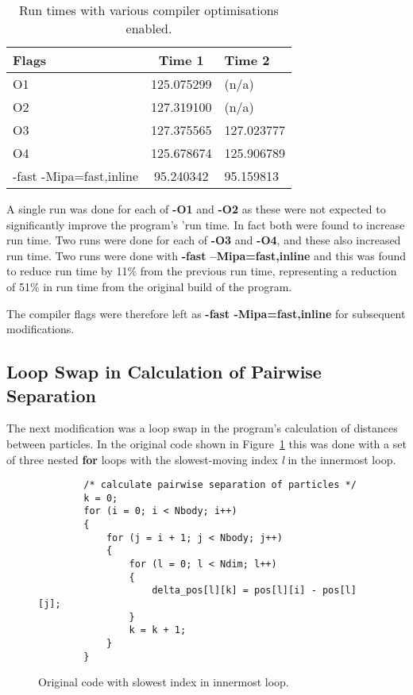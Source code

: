 \documentclass[11pt, oneside]{article}   %
\begin{document}
\begin{table}[h]
	\begin{center}
		\begin{tabular}{||l|c|l||}
			\hline
			{\bf Flags} & {\bf Time 1} & {\bf Time 2}\\
			\hline
				O1  &  125.075299  &  (n/a)\\
				O2  &  127.319100  &  (n/a)\\ 
				O3  &  127.375565  &  127.023777\\
				O4  &  125.678674  &  125.906789\\
				-fast -Mipa=fast,inline  &  95.240342  &  95.159813\\
			\hline
		\end{tabular}
	\end{center}
	\caption{Run times with various compiler optimisations enabled.}
	\label{table:OptFlags}
\end{table}

A single run was done for each of \textbf{-O1} and \textbf{-O2} as these were not expected to significantly improve the program's 'run time.  
In fact both were found to increase run time.
Two runs were done for each of \textbf{-O3} and \textbf{-O4}, and these also increased run time.
Two runs were done with \textbf{-fast –Mipa=fast,inline} and this was found to reduce run time by 11\% from the previous run time, representing a reduction of 51\% in run time from the original build of the program.

The compiler flags were therefore left as \textbf{-fast -Mipa=fast,inline} for subsequent modifications.

\subsection{Loop Swap in Calculation of Pairwise Separation}
The next modification was a loop swap in the program's calculation of distances between particles.
In the original code shown in Figure~\ref{figure:PairSepOrig} this was done with a set of three nested \textbf{for} loops with the slowest-moving index {\em l} in the innermost loop.

\begin{figure}
	\begin{lstlisting}
		/* calculate pairwise separation of particles */
		k = 0;
		for (i = 0; i < Nbody; i++)
		{
			for (j = i + 1; j < Nbody; j++)
			{
				for (l = 0; l < Ndim; l++)
				{
					delta_pos[l][k] = pos[l][i] - pos[l][j];
				}
				k = k + 1;
			}
		}
	\end{lstlisting}
	\caption{Original code with slowest index in innermost loop.}
	\label{figure:PairSepOrig}
\end{figure}
\end{document}
